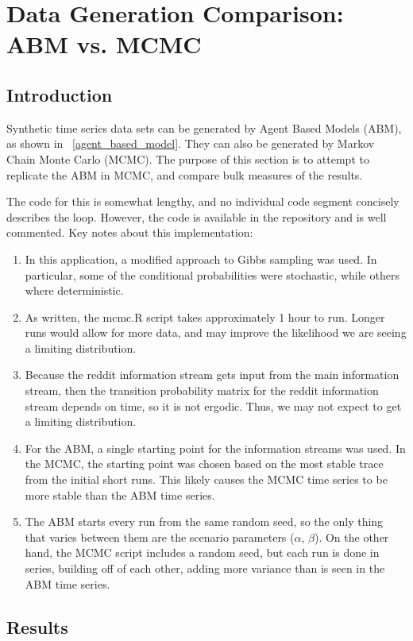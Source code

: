 \documentclass[a4paper, 11pt]{report}
\let\Oldsection\section
\renewcommand{\section}{\FloatBarrier\Oldsection}
\begin{document}
\chapter{Data Generation Comparison: ABM vs. MCMC}

\section{Introduction}
Synthetic time series data sets can be generated by Agent Based Models (ABM), as shown in ~\autoref{agent_based_model}. They can also be generated by Markov Chain Monte Carlo (MCMC). The purpose of this section is to attempt to replicate the ABM in MCMC, and compare bulk measures of the results.

The code for this is somewhat lengthy, and no individual code segment concisely describes the loop. However, the code is available in the repository and is well commented. Key notes about this implementation:
\begin{enumerate}
\item In this application, a modified approach to Gibbs sampling was used. In particular, some of the conditional probabilities were stochastic, while others where deterministic.
\item As written, the mcmc.R script takes approximately 1 hour to run. Longer runs would allow for more data, and may improve the likelihood we are seeing a limiting distribution.
\item Because the reddit information stream gets input from the main information stream, then the transition probability matrix for the reddit information stream depends on time, so it is not ergodic. Thus, we may not expect to get a limiting distribution.
\item For the ABM, a single starting point for the information streams was used. In the MCMC, the starting point was chosen based on the most stable trace from the initial short runs. This likely causes the MCMC time series to be more stable than the ABM time series.
\item The ABM starts every run from the same random seed, so the only thing that varies between them are the scenario parameters ($\alpha$, $\beta$). On the other hand, the MCMC script includes a random seed, but each run is done in series, building off of each other, adding more variance than is seen in the ABM time series.
\end{enumerate}
 
\section{Results}
\end{document}
